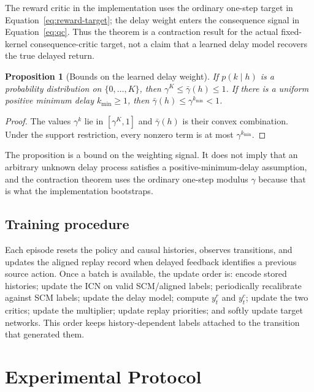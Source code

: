 \documentclass[10pt]{article}
\newtheorem{proposition}{Proposition}
\begin{document}
The reward critic in the implementation uses the ordinary one-step target in
Equation~\eqref{eq:reward-target}; the delay weight enters the consequence
signal in Equation~\eqref{eq:qc}. Thus the theorem is a contraction result for
the actual fixed-kernel consequence-critic target, not a claim that a learned
delay model recovers the true delayed return.

\begin{proposition}[Bounds on the learned delay weight]
If $p(k\mid h)$ is a probability distribution on $\{0,\ldots,K\}$, then
$\gamma^K\le\bar\gamma(h)\le1$. If there is a uniform positive minimum
delay $k_{\min}\ge1$, then $\bar\gamma(h)\le\gamma^{k_{\min}}<1$.
\end{proposition}

\begin{proof}
The values $\gamma^k$ lie in $[\gamma^K,1]$ and
$\bar\gamma(h)$ is their convex combination. Under the support restriction,
every nonzero term is at most $\gamma^{k_{\min}}$.
\end{proof}

The proposition is a bound on the weighting signal. It does not imply that
an arbitrary unknown delay process satisfies a positive-minimum-delay
assumption, and the contraction theorem uses the ordinary one-step modulus
$\gamma$ because that is what the implementation bootstraps.

\subsection{Training procedure}
Each episode resets the policy and causal histories, observes transitions, and
updates the aligned replay record when delayed feedback identifies a previous
source action. Once a batch is available, the update order is: encode stored
histories; update the ICN on valid SCM/aligned labels; periodically recalibrate
against SCM labels; update the delay model; compute $y^r_t$ and $y^c_t$; update
the two critics; update the multiplier; update replay priorities; and softly
update target networks. This order keeps history-dependent labels attached to
the transition that generated them.

\section{Experimental Protocol}
\end{document}
